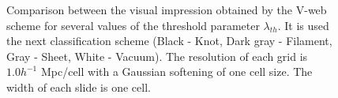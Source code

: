 \begin{figure}[htbp]
	\begin{center}
	\end{center}	
	
	\caption{\small{Comparison between the visual impression obtained by 
	the	V-web scheme for several values of the threshold parameter 
	$\lambda_{th}$. It is used the next classification scheme (Black - Knot,
	Dark gray - Filament, Gray - Sheet, White - Vacuum). The resolution of
	each grid is $1.0 h^{-1}$ Mpc/cell with a Gaussian softening of one cell
	size. The width of each slide is one cell.}}
	\label{fig:Vweb_Comparison}
\end{figure}


